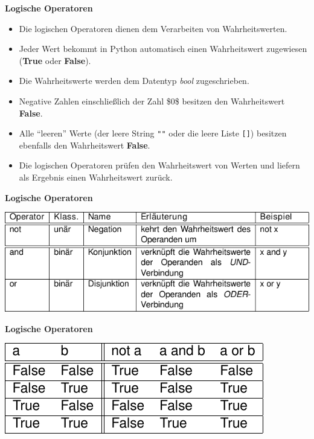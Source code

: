 \par\noindent\textbf{Logische Operatoren}

\begin{itemize}
\itemsep1pt\parskip0pt
\item
  {Die logischen Operatoren dienen dem Verarbeiten von Wahrheitswerten.}
\item
  {Jeder Wert bekommt in Python automatisch einen Wahrheitswert
  zugewiesen (\textbf{True} oder \textbf{False}).}
\item
  {Die Wahrheitswerte werden dem Datentyp \emph{bool} zugeschrieben.}
\item
  {Negative Zahlen einschließlich der Zahl \$0\$ besitzen den
  Wahrheitswert \textbf{False}.}
\item
  {Alle ``leeren'' Werte (der leere String \texttt{""} oder die leere
  Liste \texttt{{[}{]}}) besitzen ebenfalls den Wahrheitswert
  \textbf{False}.}
\item
  {Die logischen Operatoren prüfen den Wahrheitswert von Werten und
  liefern als Ergebnis einen Wahrheitswert zurück.}
\end{itemize}




\par\noindent\textbf{Logische Operatoren}

\includegraphics[width=\textwidth]{img/logische_operatoren.pdf}




\par\noindent\textbf{Logische Operatoren}

\includegraphics[width=\textwidth]{img/truth_table.pdf}





